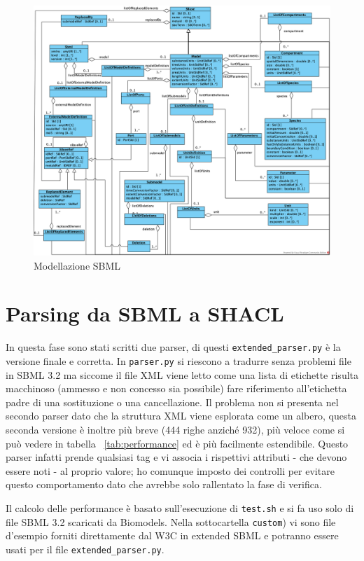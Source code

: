 \documentclass{article}
\begin{document}
\begin{figure}
    \caption{Modellazione SBML}
    \label{fig:diagram}
    \includegraphics[scale=0.6]{images/diagram.png}
\end{figure}
\clearpage

\section{Parsing da SBML a SHACL}

In questa fase sono stati scritti due parser, di questi \texttt{extended\_parser.py} è la versione finale e corretta. In \texttt{parser.py} si riescono a tradurre senza problemi file in SBML 3.2 ma siccome il file XML viene letto come una lista di etichette risulta macchinoso (ammesso e non concesso sia possibile) fare riferimento all'etichetta padre di una sostituzione o una cancellazione. Il problema non si presenta nel secondo parser dato che la struttura XML viene esplorata come un albero, questa seconda versione è inoltre più breve (444 righe anziché 932), più veloce come si può vedere in tabella ~\ref{tab:performance} ed è più facilmente estendibile. Questo parser infatti prende qualsiasi tag e vi associa i rispettivi attributi - che devono essere noti - al proprio valore; ho comunque imposto dei controlli per evitare questo comportamento dato che avrebbe solo rallentato la fase di verifica.

Il calcolo delle performance è basato sull'esecuzione di \texttt{test.sh} e si fa uso solo di file SBML 3.2 scaricati da Biomodels. Nella sottocartella \texttt{custom}) vi sono file d'esempio forniti direttamente dal W3C in extended SBML e potranno essere usati per il file \texttt{extended\_parser.py}. 
\end{document}
